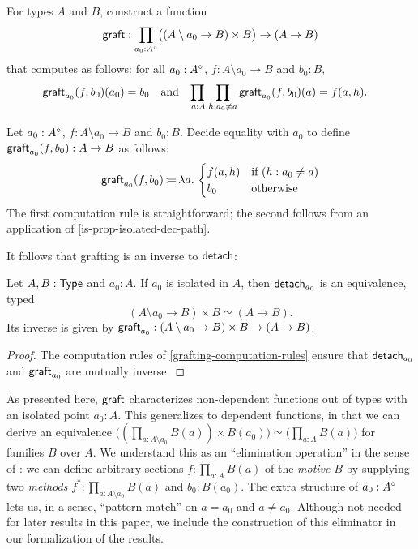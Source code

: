 \begin{problem}[note={grafting}]\label{graft}\label{grafting-computation-rules}
  For types \( A \) and \( B \), construct a function
  \[
    \operatorname{\mathsf{graft}} : \prod_{a_0 : A^{\circ}}
      \bigl((A \setminus a_0 \to B) \times B \bigr)
        \to
      (A \to B)
  \]
  that computes as follows:
  for all \( a_0 : A^{\circ} \), \( f : A \setminus a_0 \to B \) and \( b_0 : B \),
  \begin{align*}
    \Graft_{a_0}(f, b_0)(a_0) &= b_0
      &
    &\text{and}
      &
    \adjustlimits \prod_{a : A} \prod_{h : a_0 \neq a} \Graft_{a_0}(f, b_0)(a) &= f(a, h).
  \end{align*}
\end{problem}
\begin{construction}
  Let \( a_0 : A^{\circ} \), \( f : A \setminus a_0 \to B \) and \( b_0 : B \).
  Decide equality with \( a_0 \) to define \( \operatorname{\mathsf{graft}}_{a_0}(f, b_0) : A \to B \) as follows:
  \[
    \operatorname{\mathsf{graft}}_{a_0}(f, b_0) \operatorname{\mathrel{\coloneq}}
    \lambda a.\,
    \begin{cases}
      f(a, h) & \text{if}\ (h : a_0 \neq a) \\
      b_0 & \text{otherwise}
    \end{cases}
  \]
  The first computation rule is straightforward; the second follows from an application of \autoref{is-prop-isolated-dec-path}.
\end{construction}

It follows that grafting is an inverse to \( \mathsf{detach} \):
\begin{proposition}[note={\( \Graft \)-induction}]\label{graft-equiv}
  Let \( A, B : \operatorname{\mathsf{Type}} \) and \( a_0 : A \).
  If \( a_0 \) is isolated in \( A \),
  then \( \mathsf{detach}_{a_0} \) is an equivalence,
  typed
  \[
    (A \setminus a_0 \to B) \times B
      \simeq
    (A \to B).
  \]
  Its inverse is given by
  \(
    \operatorname{\mathsf{graft}}_{a_0} :
    (A \setminus a_0 \to B) \times B
      \to
    (A \to B)
  \).
  \begin{proof}
    The computation rules of \autoref{grafting-computation-rules} ensure that \( \mathsf{detach}_{a_0} \) and \( \operatorname{\mathsf{graft}}_{a_0} \)
    are mutually inverse.
  \end{proof}
\end{proposition}

As presented here, \( \Graft \) characterizes non-dependent functions out of types with an isolated point \( a_0 : A \).
This generalizes to dependent functions, in that we can derive an equivalence
\(
  \bigl( (\prod_{a : A \setminus a_0} B(a)) \times B(a_0) \bigr) \simeq \bigl(\prod_{a : A} B(a) \bigr)
\)
for families \( B \) over \( A \).
We understand this as an \enquote{elimination operation} in the sense of \cite[{\S4}]{McBrideMcKinna2004viewleft}:
we can define arbitrary sections \( f : \prod_{a : A} B(a) \) of the \emph{motive} \( B \)
by supplying two \emph{methods} \( f^* : \prod_{a : A \setminus a_0} B(a) \) and \( b_0 : B(a_0) \).
The extra structure of \( a_0 : A^{\circ} \)
lets us, in a sense, \enquote{pattern match} on \( a = a_0 \) and \( a \neq a_0 \).
Although not needed for later results in this paper,
we include the construction of this eliminator in our formalization of the results.
